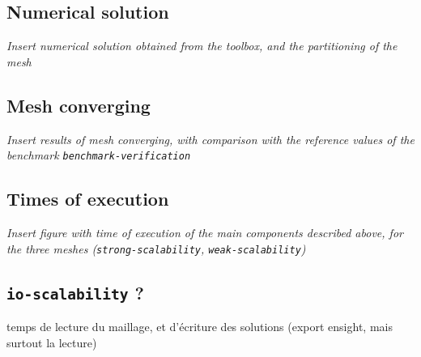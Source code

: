 \documentclass[11pt]{article}
\begin{document}
\subsection{Numerical solution}

\emph{Insert numerical solution obtained from the toolbox, and the partitioning of the mesh}



\subsection{Mesh converging}

\emph{Insert results of mesh converging, with comparison with the reference values of the benchmark \texttt{benchmark-verification}}


\subsection{Times of execution}

\emph{Insert figure with time of execution of the main components described above, for the three meshes (\texttt{strong-scalability}, \texttt{weak-scalability})}


\subsection{\texttt{io-scalability} ?} temps de lecture du maillage, et d'écriture des solutions (export ensight, mais surtout la lecture)



\printbibliography
\end{document}
